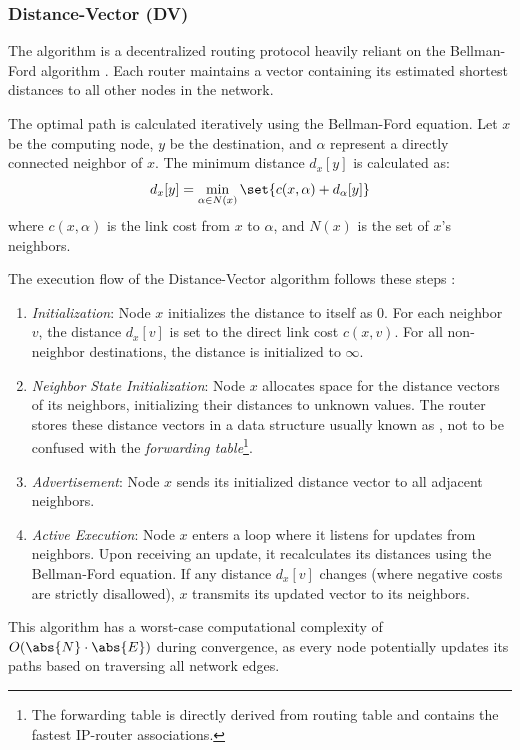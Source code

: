 \subsubsection{Distance-Vector (DV)}
The  algorithm is a decentralized routing protocol heavily reliant on the Bellman-Ford algorithm \cite{kurose2017}. Each router maintains a vector containing its estimated shortest distances to all other nodes in the network. 

The optimal path is calculated iteratively using the Bellman-Ford equation. Let \(x\) be the computing node, \(y\) be the destination, and \(\alpha\) represent a directly connected neighbor of \(x\). The minimum distance \(d_x[y]\) is calculated as:
\[ d_x[y] = \min_{\alpha \in N(x)}\set{c(x, \alpha) + d_{\alpha}[y]} \]
where \(c(x, \alpha)\) is the link cost from \(x\) to \(\alpha\), and \(N(x)\) is the set of \(x\)'s neighbors.

The execution flow of the Distance-Vector algorithm follows these steps \cite{rfc2453}:
\begin{enumerate}
    \item \emph{Initialization}: Node \(x\) initializes the distance to itself as 0. For each neighbor \(v\), the distance \(d_x[v]\) is set to the direct link cost \(c(x, v)\). For all non-neighbor destinations, the distance is initialized to \(\infty\).
    \item \emph{Neighbor State Initialization}: Node \(x\) allocates space for the distance vectors of its neighbors, initializing their distances to unknown values. The router stores these distance vectors in a data structure usually known as , not to be confused with the \emph{forwarding table}\footnote{The forwarding table is directly derived from routing table and contains the fastest IP-router associations.}.
    \item \emph{Advertisement}: Node \(x\) sends its initialized distance vector to all adjacent neighbors.
    \item \emph{Active Execution}: Node \(x\) enters a loop where it listens for updates from neighbors. Upon receiving an update, it recalculates its distances using the Bellman-Ford equation. If any distance \(d_x[v]\) changes (where negative costs are strictly disallowed), \(x\) transmits its updated vector to its neighbors.
\end{enumerate}

This algorithm has a worst-case computational complexity of \(O(\abs{N} \cdot \abs{E})\) during convergence, as every node potentially updates its paths based on traversing all network edges.

